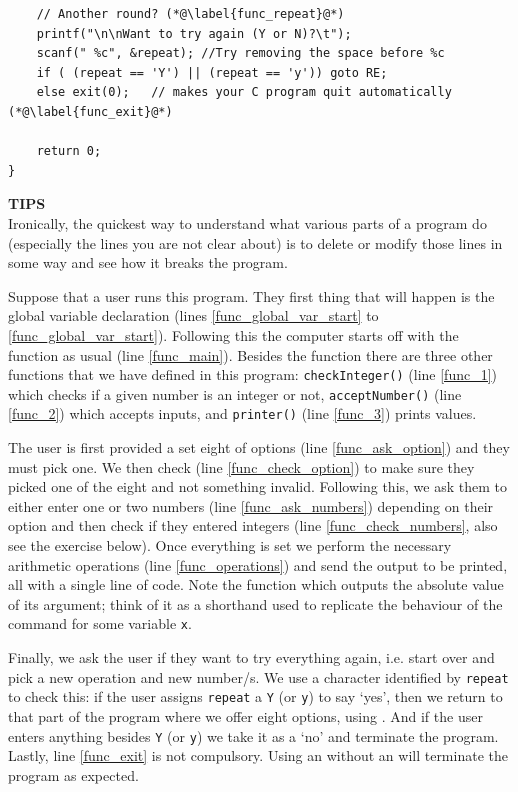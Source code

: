 \documentclass[11pt,oneside]{article}
\newcounter{exercise}
\newcommand{\eb}[1]{\textbf{\scriptsize{\sffamily\addfontfeatures{LetterSpace=7} #1\\[.35em]}}}
\begin{document}
{{{{{{{{{\begin{lstlisting}
    // Another round? (*@\label{func_repeat}@*)
    printf("\n\nWant to try again (Y or N)?\t");
    scanf(" %c", &repeat); //Try removing the space before %c
    if ( (repeat == 'Y') || (repeat == 'y')) goto RE;
    else exit(0);   // makes your C program quit automatically (*@\label{func_exit}@*)
    
    return 0;
}
\end{lstlisting}

\begin{errorbox}
\eb{TIPS }
Ironically, the quickest way to understand what various parts of a program do (especially the lines you are not clear about) is to delete or modify those lines in some way and see how it breaks the program.
\end{errorbox}

Suppose that a user runs this program. They first thing that will happen is the global variable declaration (lines \ref{func_global_var_start} to \ref{func_global_var_start}). Following this the computer starts off with the  function as usual (line \ref{func_main}). Besides the  function there are three other functions that we have defined in this program: \verb+checkInteger()+ (line \ref{func_1}) which checks if a given number is an integer or not, \verb+acceptNumber()+ (line \ref{func_2}) which accepts inputs, and \verb+printer()+ (line \ref{func_3}) prints values.

The user is first provided a set eight of options (line \ref{func_ask_option}) and they must pick one. We then check (line \ref{func_check_option}) to make sure they picked one of the eight and not something invalid. Following this, we ask them to either enter one or two numbers (line \ref{func_ask_numbers}) depending on their option and then check if they entered integers (line \ref{func_check_numbers}, also see the exercise below). Once everything is set we perform the necessary arithmetic operations (line \ref{func_operations}) and send the output to be printed, all with a single line of code. Note the  function which outputs the absolute value of its argument; think of it as a shorthand used to replicate the behaviour of the command  for some  variable \verb+x+.

Finally, we ask the user if they want to try everything again, i.e. start over and pick a new operation and new number/s. We use a character identified by \verb+repeat+ to check this: if the user assigns \verb+repeat+ a \verb+Y+ (or \verb+y+) to say `yes', then we return to that part of the program where we offer eight options, using . And if the user enters anything besides \verb+Y+ (or \verb+y+) we take it as a `no' and terminate the program. Lastly, line \ref{func_exit} is not compulsory. Using an  without an  will terminate the program as expected.\\

}}}}}}}}}
\end{document}
